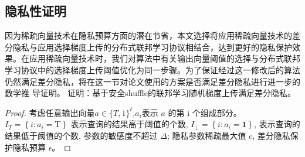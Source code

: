 \subsection{隐私性证明}
因为稀疏向量技术在隐私预算方面的潜在节省，本文选择将应用稀疏向量技术的差分隐私与应用选择梯度上传的分布式联邦学习协议相结合，达到更好的隐私保护效果。在应用稀疏向量技术时，我们对算法中有关输出向量阈值的选择与分布式联邦学习协议中的选择梯度上传阈值优化为同一步骤。为了保证经过这一修改后的算法仍然满足差分隐私，将在这一节对论文使用的方案是否满足差分隐私进行进一步的数学推
导证明。 
证明：基于安全shuffle的联邦学习随机梯度上传满足差分隐私。
\begin{proof}
考虑任意输出向量$a \in\{T, 1\}^{\ell}$,$a_{i}$表示 $a$ 的第 $\mathrm{i}$ 个组成部分。 $I_{T}=\left\{i: a_{i}=\mathrm{T}\right\}$ 表示查询的结果高于阈值的个数, $I_{\perp}=\left\{i: a_{i}=\mathbf{1}\right\}$, 表示查询的结果低于阈值的个数, 参数的敏感度不超过 $\Delta$; 隐私参数稀疏最大值 $c$, 差分隐私保护隐私预算 $\epsilon$。


\end{proof}
